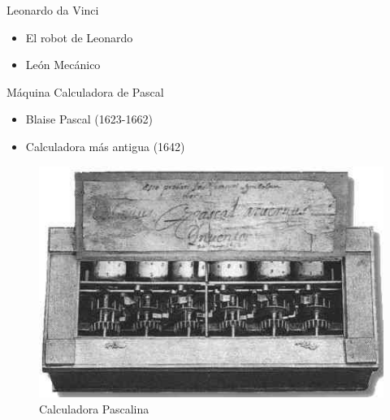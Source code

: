 
\begin{frame}[fragile]{Leonardo da Vinci}
\vspace{10px}
\pause
{}
\begin{block}{}
	\begin{itemize}
		\item El robot de Leonardo
		\pause
		\item León Mecánico
	\end{itemize}
\end{block}
\end{frame}



\begin{frame}[fragile]{Máquina Calculadora de Pascal}
\vspace{10px}
\pause
{}
\begin{block}{}
	\begin{itemize}
		\item Blaise Pascal (1623-1662)
		\pause
		\item Calculadora más antigua (1642)
	\end{itemize}
\end{block}
\begin{figure}
		\centering
		\includegraphics[scale=0.3]{./EtapaPrimeriza/imagenes/cp.jpg}
		\caption{Calculadora Pascalina}
\end{figure}
\end{frame}




